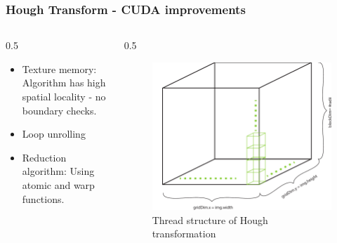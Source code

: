 \documentclass{beamer}
\begin{document}
\begin{frame}
    [fragile] \frametitle{Hough Transform - CUDA improvements}
    \begin{columns}
        \begin{column}
            {0.5
            \textwidth}
            \begin{itemize}
                \item Texture memory: Algorithm has high spatial locality - no boundary checks.
                \item Loop unrolling
                \item Reduction algorithm: Using atomic and warp functions.
            \end{itemize}
        \end{column}
        \begin{column}
            {0.5
            \textwidth}
            \begin{figure}
                [ht] \centering
                \includegraphics[width=0.999
                \textwidth]{../report/iris/hough_impl} \caption{Thread structure of Hough transformation} \label{fig:hough_impl}
            \end{figure}
        \end{column}
    \end{columns}
\end{frame}
\end{document}

